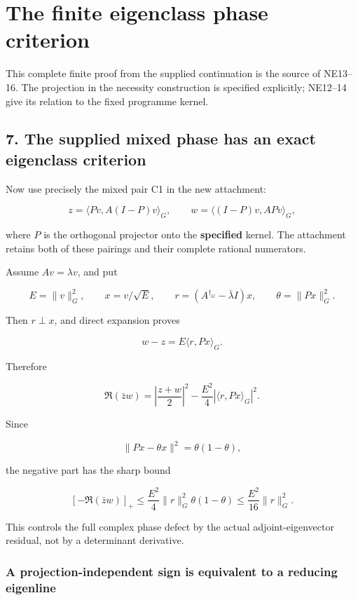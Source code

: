 \section{The finite eigenclass phase criterion}\label{the-finite-eigenclass-phase-criterion}

This complete finite proof from the supplied continuation is the source of NE13--16. The projection in the necessity construction is specified explicitly; NE12--14 give its relation to the fixed programme kernel.

\subsection{7. The supplied mixed phase has an exact eigenclass criterion}\label{the-supplied-mixed-phase-has-an-exact-eigenclass-criterion}

Now use precisely the mixed pair C1 in the new attachment:

\[
z=\langle Pv,A(I-P)v\rangle_G,
\qquad
w=\langle(I-P)v,APv\rangle_G,
\]

where \(P\) is the orthogonal projector onto the \textbf{specified} kernel. The attachment retains both of these pairings and their complete rational numerators.

Assume \(Av=\lambda v\), and put

\[
E=\|v\|_G^2,\qquad
x=v/\sqrt E,\qquad
r=(A^{\dagger_G}-\bar\lambda I)x,
\qquad
\theta=\|Px\|_G^2.
\]

Then \(r\perp x\), and direct expansion proves

\[
w-z=E\langle r,Px\rangle_G.
\]

Therefore

\[
\boxed{
\Re(\bar zw)
=
\left|\frac{z+w}{2}\right|^2
-\frac{E^2}{4}|\langle r,Px\rangle_G|^2.
}
\tag{38}
\]

Since

\[
\|Px-\theta x\|^2=\theta(1-\theta),
\]

the negative part has the sharp bound

\[
\boxed{
[-\Re(\bar zw)]_+
\le
\frac{E^2}{4}\|r\|_G^2\theta(1-\theta)
\le
\frac{E^2}{16}\|r\|_G^2.
}
\tag{39}
\]

This controls the full complex phase defect by the actual adjoint-eigenvector residual, not by a determinant derivative.

\subsubsection{A projection-independent sign is equivalent to a reducing eigenline}\label{a-projection-independent-sign-is-equivalent-to-a-reducing-eigenline}

